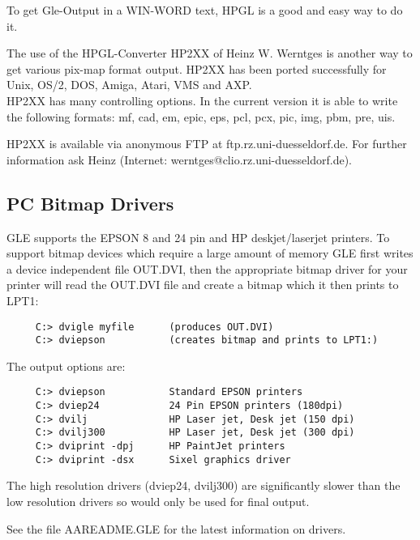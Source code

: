 To get Gle-Output in a WIN-WORD text, HPGL is a good and easy way to do it.
 

The use of the HPGL-Converter HP2XX of Heinz W. Werntges is another way to
get various pix-map format output. HP2XX has been ported successfully 
for Unix, OS/2, DOS, Amiga, Atari, VMS and AXP. \\ 
HP2XX has many controlling options. In
the current version it is able to write the following formats: 
mf, cad, em, epic, eps, pcl, pcx, pic, img, pbm, pre, uis.

HP2XX is available via anonymous FTP at ftp.rz.uni-duesseldorf.de. For
further information ask Heinz (Internet:
werntges@clio.rz.uni-duesseldorf.de).
%

\subsection{PC Bitmap Drivers}
GLE supports the EPSON 8 and 24 pin and HP deskjet/laserjet printers.
To support bitmap devices which require a large amount of memory GLE 
first writes a device independent file OUT.DVI, then the
appropriate bitmap driver for your printer will read the OUT.DVI file
and create a bitmap which it then prints to LPT1:

\begin{verbatim}
     C:> dvigle myfile      (produces OUT.DVI)
     C:> dviepson           (creates bitmap and prints to LPT1:)
\end{verbatim}

The output options are:
\begin{verbatim}
     C:> dviepson           Standard EPSON printers 
     C:> dviep24            24 Pin EPSON printers (180dpi)
     C:> dvilj              HP Laser jet, Desk jet (150 dpi)
     C:> dvilj300           HP Laser jet, Desk jet (300 dpi)
     C:> dviprint -dpj      HP PaintJet printers
     C:> dviprint -dsx      Sixel graphics driver
\end{verbatim}
The high resolution drivers (dviep24, dvilj300) are significantly slower
than the low resolution drivers so would only be used for final output.

See the file AAREADME.GLE for the latest information on drivers.
\clearpage
